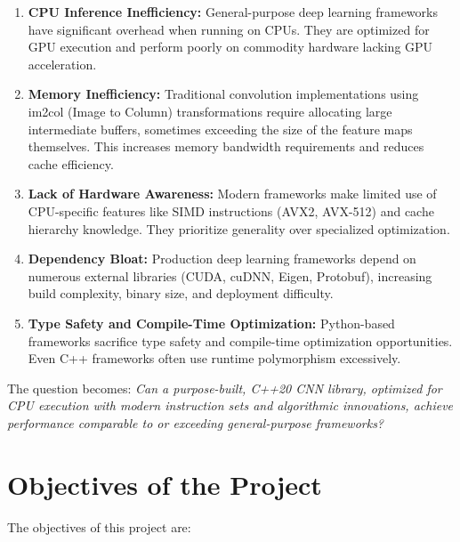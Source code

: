 \documentclass[12pt,oneside,a4paper]{report}
\begin{document}
\begin{enumerate}
    \item \textbf{CPU Inference Inefficiency:} General-purpose deep learning frameworks have significant overhead when running on CPUs. They are optimized for GPU execution and perform poorly on commodity hardware lacking GPU acceleration.

    \item \textbf{Memory Inefficiency:} Traditional convolution implementations using im2col (Image to Column) transformations require allocating large intermediate buffers, sometimes exceeding the size of the feature maps themselves. This increases memory bandwidth requirements and reduces cache efficiency.

    \item \textbf{Lack of Hardware Awareness:} Modern frameworks make limited use of CPU-specific features like SIMD instructions (AVX2, AVX-512) and cache hierarchy knowledge. They prioritize generality over specialized optimization.

    \item \textbf{Dependency Bloat:} Production deep learning frameworks depend on numerous external libraries (CUDA, cuDNN, Eigen, Protobuf), increasing build complexity, binary size, and deployment difficulty.

    \item \textbf{Type Safety and Compile-Time Optimization:} Python-based frameworks sacrifice type safety and compile-time optimization opportunities. Even C++ frameworks often use runtime polymorphism excessively.
\end{enumerate}

The question becomes: \textit{Can a purpose-built, C++20 CNN library, optimized for CPU execution with modern instruction sets and algorithmic innovations, achieve performance comparable to or exceeding general-purpose frameworks?}

\section{Objectives of the Project}

The objectives of this project are:
\end{document}
